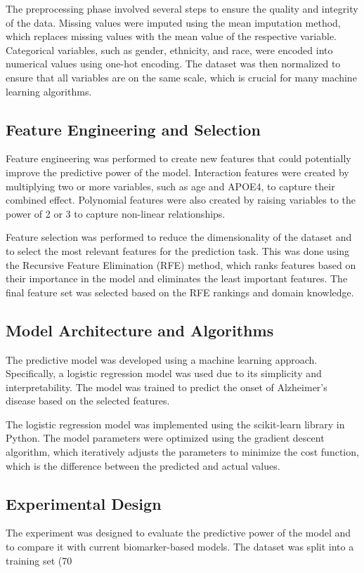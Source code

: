 \documentclass[conference]{IEEEtran}
\begin{document}
The preprocessing phase involved several steps to ensure the quality and integrity of the data. Missing values were imputed using the mean imputation method, which replaces missing values with the mean value of the respective variable. Categorical variables, such as gender, ethnicity, and race, were encoded into numerical values using one-hot encoding. The dataset was then normalized to ensure that all variables are on the same scale, which is crucial for many machine learning algorithms.

\subsection{Feature Engineering and Selection}
Feature engineering was performed to create new features that could potentially improve the predictive power of the model. Interaction features were created by multiplying two or more variables, such as age and APOE4, to capture their combined effect. Polynomial features were also created by raising variables to the power of 2 or 3 to capture non-linear relationships.

Feature selection was performed to reduce the dimensionality of the dataset and to select the most relevant features for the prediction task. This was done using the Recursive Feature Elimination (RFE) method, which ranks features based on their importance in the model and eliminates the least important features. The final feature set was selected based on the RFE rankings and domain knowledge.

\subsection{Model Architecture and Algorithms}
The predictive model was developed using a machine learning approach. Specifically, a logistic regression model was used due to its simplicity and interpretability. The model was trained to predict the onset of Alzheimer's disease based on the selected features.

The logistic regression model was implemented using the scikit-learn library in Python. The model parameters were optimized using the gradient descent algorithm, which iteratively adjusts the parameters to minimize the cost function, which is the difference between the predicted and actual values.

\subsection{Experimental Design}
The experiment was designed to evaluate the predictive power of the model and to compare it with current biomarker-based models. The dataset was split into a training set (70%
\end{document}
